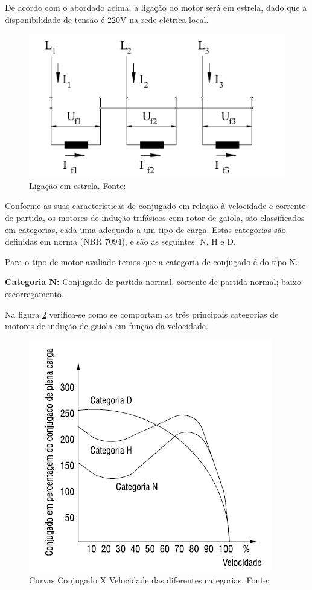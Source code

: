 De acordo com o abordado acima, a ligação do motor será em estrela, dado que a disponibilidade de tensão é 220V na rede elétrica local.

\begin{figure}[h!]
\centering
\includegraphics[scale=0.8]{figuras/ESTRELA.png}
\caption{Ligação em estrela. Fonte:\cite{WEG_catalogo}}
\label{fig:ESTRELA}
\end{figure}

Conforme as suas características de conjugado em relação à velocidade e corrente de partida, os motores de indução trifásicos com rotor de gaiola, são classificados em categorias, cada uma adequada a um tipo de carga. Estas categorias são definidas em norma (NBR 7094), e são as seguintes: N, H e D.\cite{WEG_catalogo}

Para o tipo de motor avaliado temos que a categoria de conjugado é do tipo N. \cite{WEG_catalogo}

\textbf{Categoria N:} Conjugado de partida normal, corrente de partida normal; baixo escorregamento.\cite{WEG_catalogo}

Na figura \ref{fig:conjugado_N} verifica-se como se comportam as três principais categorias de motores de indução de gaiola em função da velocidade.

\begin{figure}[H]
\centering
\includegraphics[scale=0.8]{figuras/conjugado_N.png}
\caption{Curvas Conjugado X Velocidade das diferentes categorias. Fonte:\cite{WEG_catalogo}}
\label{fig:conjugado_N}
\end{figure}

